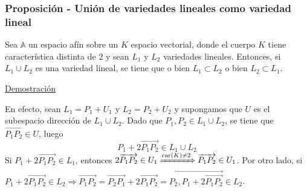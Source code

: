 \documentclass[12pt, a4paper, ones, notitlepage, openany,titlepage]{article}
\begin{document}
\subsubsection{Proposición - Unión de variedades lineales como variedad lineal}
Sea $\mathbb{A}$ un espacio afín sobre un $K$ espacio vectorial, donde el cuerpo $K$ tiene característica distinta de 2 y sean $L_{1}$ y $L_{2}$ variedades lineales. Entonces, si $L_1 \cup L_2$ es una variedad lineal, se tiene que o bien $L_{1} \subset L_{2}$ o bien $L_{2} \subset L_{1}$.

\noindent\underline{Demostración}

En efecto, sean $L_{1}=P_{1}+U_{1}$ y $L_{2}=P_{2}+U_{2}$ y supongamos que $U$ es el subespacio dirección de $L_{1} \cup L_{2}$. Dado que $P_{1}, P_{2} \in L_{1} \cup L_{2}$, se tiene que $\overrightarrow{P_{1} P_{2}} \in U$, luego
$$
P_{1}+2 \overrightarrow{P_{1} P_{2}} \in L_{1} \cup L_{2}
$$
\noindent Si $P_{1}+2 \overrightarrow{P_{1} P_{2}} \in L_{1}$, entonces $2 \overrightarrow{P_{1} P_{2}} \in U_{1} \xRightarrow{\operatorname{car}(K) \neq 2} \overrightarrow{P_1 P_2} \in U_1$. Por otro lado, si $P_{1}+2 \overrightarrow{P_{1} P_{2}} \in L_{2} \Longrightarrow \overrightarrow{P_{1} P_{2}}=\overrightarrow{P_{2} P_{1}}+2 \overrightarrow{P_{1} P_{2}}=\overrightarrow{P_{2}, P_{1}+2 \overrightarrow{P_{1} P_{2}}} \in L_2$.
\end{document}
